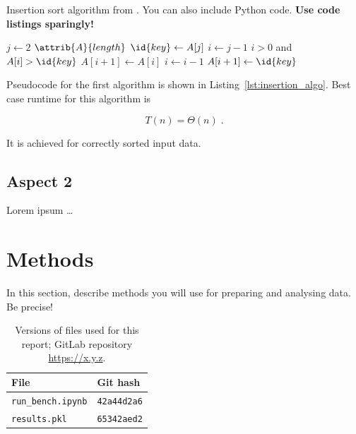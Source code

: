 \documentclass[sigconf, nonacm, natbib, screen, balance=False]{acmart}
\begin{document}
\begin{listing}
  \caption{Insertion sort algorithm from \citet[Ch.~2.1]{CLRS_2009}.
    You can also include Python code. \textbf{Use code listings sparingly!}
    }
  \label{lst:insertion_algo}
  \begin{codebox}
    \li \For $j \gets 2$ \To $\attrib{A}{length}$
    \li \Do
    $\id{key} \gets A[j]$
    \li     $i \gets j-1$
    \li      \While $i>0$ and $A[i] > \id{key}$
    \li      \Do
    $A[i+1] \gets A[i]$
    \li         $i \gets i-1$
    \End    
    \li       $A[i+1]\gets \id{key}$
    \End
  \end{codebox}
\end{listing}

Pseudocode for the first algorithm is shown in
Listing~\ref{lst:insertion_algo}. Best case runtime for this algorithm
is

\begin{equation}
  T(n) = \Theta(n) \;.  \label{eq:ins_sort_best}
\end{equation}

It is achieved for correctly sorted input data.

\subsection{Aspect 2}\label{sec:aspect2}

Lorem ipsum \dots


\section{Methods}\label{sec:methods}

In this section, describe methods you will use for preparing and
analysing data. Be precise!

\begin{table}
  \caption{Versions of files used for this report; GitLab repository
    \url{https://x.y.z}.}
  \label{tab:hashes}
  \begin{tabular}{ll}
    \hline
    File & Git hash \\\hline
    \verb!run_bench.ipynb! & \verb!42a44d2a6! \\
    \verb!results.pkl! & \verb!65342aed2! \\\hline
  \end{tabular}
\end{table}
\end{document}
